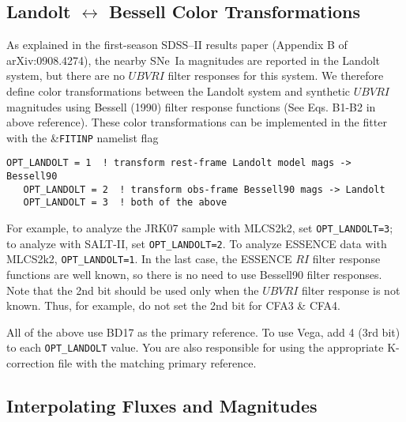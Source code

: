 \documentclass[12pt]{article}
\begin{document}
  \subsection{Landolt $\leftrightarrow$ Bessell Color Transformations}
  \label{subsec:OPT_LANDOLT}

As explained in the first-season SDSS--II results paper
(Appendix B of arXiv:0908.4274), the nearby SNe~Ia
magnitudes are reported in the Landolt system, but
there are no $UBVRI$ filter responses for this system.
We therefore define color transformations between the
Landolt system and synthetic $UBVRI$ magnitudes using 
Bessell (1990) filter response functions 
(See Eqs. B1-B2 in above reference).
These color transformations can be implemented in the fitter
with the \&{\tt FITINP} namelist flag
%
\begin{Verbatim}[frame=single]
   OPT_LANDOLT = 1  ! transform rest-frame Landolt model mags -> Bessell90
   OPT_LANDOLT = 2  ! transform obs-frame Bessell90 mags -> Landolt
   OPT_LANDOLT = 3  ! both of the above
\end{Verbatim}

For example, to analyze the JRK07 sample with MLCS2k2, 
set {\tt OPT\_LANDOLT=3}; to analyze with SALT-II, 
set {\tt OPT\_LANDOLT=2}.
To analyze ESSENCE data with MLCS2k2, 
{\tt OPT\_LANDOLT=1}. In the last case, the ESSENCE
$RI$ filter response functions are well known, 
so there is no need to use Bessell90 filter responses.
Note that the 2nd bit should be used only when
the $UBVRI$ filter response is not known.
Thus, for example, do not set the 2nd bit for CFA3 \& CFA4.

All of the above use BD17 as the primary reference.
To use Vega, add 4 (3rd bit) to each {\tt OPT\_LANDOLT} value.
You are also responsible for using the appropriate K-correction
file with the matching primary reference.

   \clearpage
   \subsection{Interpolating Fluxes and Magnitudes}
   \label{subsec:interp}
\end{document}
